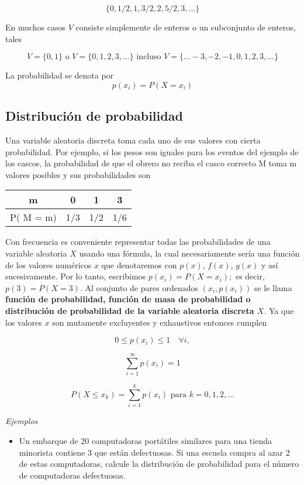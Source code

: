 \documentclass[11pt]{article}
\providecommand{\tightlist}{%
      \setlength{\itemsep}{0pt}\setlength{\parskip}{0pt}}
\begin{document}
\[
\lbrace 0, 1/2 , 1, 3/2 , 2, 5/2 , 3, \ldots \rbrace 
\]

En muchos casos \(V\) consiste simplemente de enteros o un subconjunto
de enteros, tales

\[
V = \lbrace0, 1 \rbrace \text{  o  } V = \lbrace 0, 1, 2, 3, \ldots \rbrace  \text{ incluso } V = \lbrace \ldots − 3, −2, −1, 0, 1, 2, 3, \ldots \rbrace
\]

La probabilidad se denota por \[
p(x_{i} ) = P(X = x_{i} )
\]

    \hypertarget{distribuciuxf3n-de-probabilidad}{%
\subsection{Distribución de
probabilidad}\label{distribuciuxf3n-de-probabilidad}}

Una variable aleatoria discreta toma cada uno de sus valores con cierta
probabilidad. Por ejemplo, si los pesos son iguales para los eventos del
ejemplo de los cascos, la probabilidad de que el obrero no reciba el
casco correcto M toma m valores posibles y sus probabilidades son

\begin{longtable}[]{@{}cccc@{}}
\toprule
m & 0 & 1 & 3\tabularnewline
\midrule
\endhead
P( M = m) & 1/3 & 1/2 & 1/6\tabularnewline
\bottomrule
\end{longtable}

Con frecuencia es conveniente representar todas las probabilidades de
una variable aleatoria \(X\) usando una fórmula, la cual necesariamente
sería una función de los valores numéricos \(x\) que denotaremos con
\(p (x)\), \(f(x)\), \(g (x)\) y así sucesivamente. Por lo tanto,
escribimos \(p(x_{i}) = P(X = x_{i});\) es decir, \(p (3) = P(X = 3)\).
Al conjunto de pares ordenados \((x_{i},p (x_{i}))\) se le llama
\textbf{función de probabilidad, función de masa de probabilidad o
distribución de probabilidad de la variable aleatoria discreta \(X\)}.
Ya que los valores \(x\) son mutamente excluyentes y exhaustivos
entonces cumplen

\[
0 \leq p (x_{i}) \leq 1 \quad \forall i,
\]

\[
\sum\limits_{i=1}^{\infty} p (x_{i}) =1   
\]

\[
P(X \leq x_{k})= \sum\limits_{i=1}^{k} p (x_{i}) \text{ para  } k=0,1,2,\ldots   
\]

\emph{Ejemplos}

\begin{itemize}
\tightlist
\item
  Un embarque de 20 computadoras portátiles similares para una tienda
  minorista contiene 3 que están defectuosas. Si una escuela compra al
  azar 2 de estas computadoras, calcule la distribución de probabilidad
  para el número de computadoras defectuosas.
\end{itemize}
\end{document}
